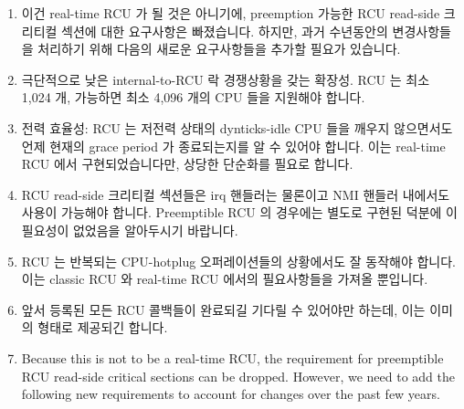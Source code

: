 \begin{enumerate}
\item	이건 real-time RCU 가 될 것은 아니기에, preemption 가능한 RCU read-side
	크리티컬 섹션에 대한 요구사항은 빠졌습니다.
	하지만, 과거 수년동안의 변경사항들을 처리하기 위해 다음의 새로운
	요구사항들을 추가할 필요가 있습니다.

\item	극단적으로 낮은 internal-to-RCU 락 경쟁상황을 갖는 확장성.
	RCU 는 최소 1,024 개, 가능하면 최소 4,096 개의 CPU 들을 지원해야
	합니다.
\item	전력 효율성: RCU 는 저전력 상태의 dynticks-idle CPU 들을 깨우지
	않으면서도 언제 현재의 grace period 가 종료되는지를 알 수 있어야
	합니다.
	이는 real-time RCU 에서 구현되었습니다만, 상당한 단순화를 필요로
	합니다.
\item	RCU read-side 크리티컬 섹션들은 irq 핸들러는 물론이고 NMI 핸들러
	내에서도 사용이 가능해야 합니다.  Preemptible RCU 의 경우에는 별도로
	구현된  덕분에 이 필요성이 없었음을 알아두시기
	바랍니다.
\item	RCU 는 반복되는 CPU-hotplug 오퍼레이션들의 상황에서도 잘 동작해야
	합니다.
	이는 classic RCU 와 real-time RCU 에서의 필요사항들을 가져올 뿐입니다.
\item	앞서 등록된 모든 RCU 콜백들이 완료되길 기다릴 수 있어야만 하는데, 이는
	이미  의 형태로 제공되긴 합니다.
\iffalse

\item	Because this is not to be a real-time RCU, the requirement for
	preemptible RCU read-side critical sections can be dropped.
	However, we need to add the following new requirements to account
	for changes over the past few years.


\end{enumerate}
